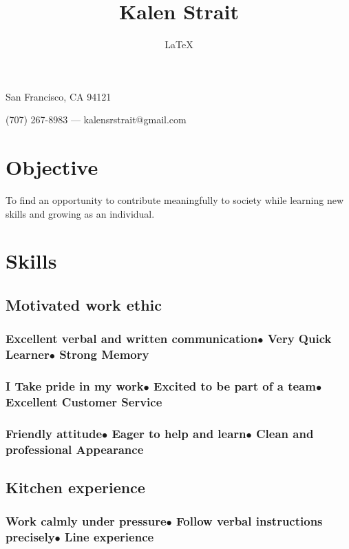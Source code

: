 \documentclass{article}
\author{{\LaTeX}}
\title{Kalen Strait}
\makeatletter
\renewcommand{\maketitle}{
	\begin{center}
		{\huge\bfseries
		\thetitle}
		
		\vspace{.3em}

		San Francisco, CA 94121

		\vspace{.3em}


		(707) 267-8983 --- kalensrstrait@gmail.com


		\end{center}
	}
\makeatother
\begin{document}
\maketitle



\section{Objective}

To find an opportunity to contribute meaningfully to society while learning new skills and growing as an individual.

\section{Skills}

\subsection{Motivated work ethic}

\subsubsection{Excellent verbal and written communication\hfill$\bullet$ Very Quick Learner\hfill$\bullet$ Strong Memory}

\subsubsection{I Take pride in my work\hfill$\bullet$ Excited to be part of a team\hfill$\bullet$ Excellent Customer Service}

\subsubsection{Friendly attitude\hfill$\bullet$ Eager to help and learn\hfill$\bullet$ Clean and professional Appearance}



\subsection{Kitchen experience}

\subsubsection{Work calmly under pressure\hfill$\bullet$ Follow verbal instructions precisely\hfill$\bullet$ Line experience}
\end{document}
